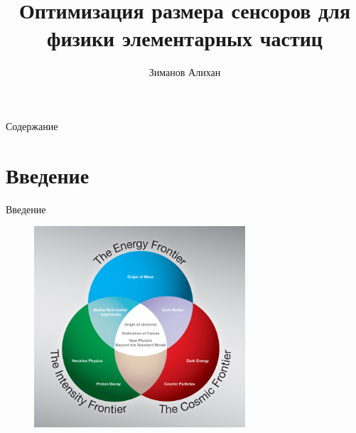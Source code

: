 \documentclass[9pt]{beamer}
\title[\textbf{}]{Оптимизация размера сенсоров для физики элементарных частиц} %
\author[\textbf{Зиманов Алихан}]
{Зиманов Алихан} %
\institute[\textbf{ВШЭ}] %
{Исследовательский проект\\
ВКР %
}
\begin{document}
{
\beamertemplatenavigationsymbolsempty
\begin{frame}[plain]
\titlepage
\end{frame}
}

{
\beamertemplatenavigationsymbolsempty
{}
{ }
\begin{frame}{Содержание} 
\tableofcontents 
\end{frame} 
}

\addtocounter{framenumber}{-2}

\section{Введение}

\begin{frame}{Введение}
    \begin{figure}
        \centering
        \includegraphics[width=0.7\textwidth]{images/high_energy_physics.jpg}
    \end{figure}
\end{frame}
\end{document}
